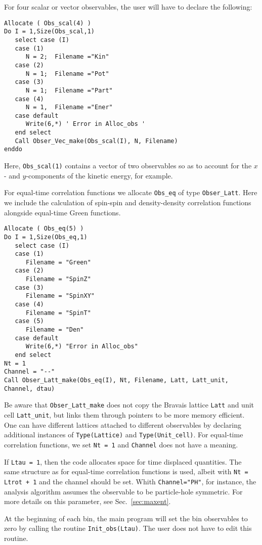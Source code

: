 For  four scalar  or vector observables,  the user will have to  declare the following: 
\begin{lstlisting}[style=fortran]
Allocate ( Obs_scal(4) )
Do I = 1,Size(Obs_scal,1)
   select case (I)
   case (1)
      N = 2;  Filename ="Kin"
   case (2)
      N = 1;  Filename ="Pot"
   case (3)
      N = 1;  Filename ="Part"
   case (4)
      N = 1,  Filename ="Ener"
   case default
      Write(6,*) ' Error in Alloc_obs '  
   end select
   Call Obser_Vec_make(Obs_scal(I), N, Filename)
enddo
\end{lstlisting}
Here,   \texttt{Obs\_scal(1)}   contains a vector  of two observables  so as to account for the $x$- and $y$-components of the kinetic energy, for example.  

For equal-time correlation functions  we allocate  \texttt{Obs\_eq}  of type \texttt{Obser\_Latt}.  Here we include the calculation of spin-spin and density-density correlation functions alongside equal-time Green functions. 
\begin{lstlisting}[style=fortran]
Allocate ( Obs_eq(5) )
Do I = 1,Size(Obs_eq,1)
   select case (I)
   case (1)
      Filename = "Green"
   case (2)
      Filename = "SpinZ"
   case (3)
      Filename = "SpinXY"
   case (4)
      Filename = "SpinT"
   case (5)
      Filename = "Den"
   case default
      Write(6,*) "Error in Alloc_obs"
   end select
Nt = 1
Channel = "--"
Call Obser_Latt_make(Obs_eq(I), Nt, Filename, Latt, Latt_unit, Channel, dtau)
\end{lstlisting} 
Be aware that \texttt{Obser\_Latt\_make} does not copy the Bravais lattice \texttt{Latt} 
and unit cell \texttt{Latt\_unit}, but links them through pointers to be more memory 
efficient. One can have different lattices attached to different observables by declaring 
additional instances of \texttt{Type(Lattice)} and \texttt{Type(Unit\_cell)}.
 For equal-time correlation functions, we set \texttt{Nt = 1} and \texttt{Channel} does not have a meaning.

If \texttt{Ltau = 1}, then the code allocates space for time displaced quantities. The 
same structure as for equal-time correlation functions is used, albeit with 
\texttt{Nt = Ltrot + 1} and the channel should be set. Whith \texttt{Channel="PH"}, for instance, the analysis algorithm assumes the observable to be particle-hole symmetric. For more details on this parameter, see Sec.~\ref{sec:maxent}.

At the beginning of each bin, the main program will set the bin observables to zero by calling  the routine \texttt{Init\_obs(Ltau)}. The user does not have to edit this routine. 
 
